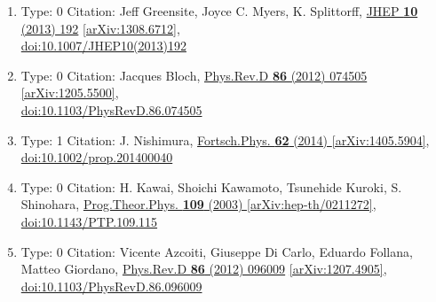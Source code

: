 \documentclass[a4paper,10pt]{article}
\begin{document}
\begin{enumerate}
\begin{enumerate}
  \item Type: 0 Citation: Jeff Greensite, Joyce C. Myers, K. Splittorff, \href{https://www.doi.org/10.1007/JHEP10(2013)192}{JHEP {\bf 10} (2013) 192}  \href{https://arxiv.org/abs/1308.6712}{[arXiv:1308.6712]},\\\href{https://www.doi.org/10.1007/JHEP10(2013)192}{doi:10.1007/JHEP10(2013)192}
  \item Type: 0 Citation: Jacques Bloch, \href{https://www.doi.org/10.1103/PhysRevD.86.074505}{Phys.Rev.D {\bf 86} (2012) 074505}  \href{https://arxiv.org/abs/1205.5500}{[arXiv:1205.5500]},\\\href{https://www.doi.org/10.1103/PhysRevD.86.074505}{doi:10.1103/PhysRevD.86.074505}
  \item Type: 1 Citation: J. Nishimura, \href{https://www.doi.org/10.1002/prop.201400040}{Fortsch.Phys. {\bf 62} (2014) }  \href{https://arxiv.org/abs/1405.5904}{[arXiv:1405.5904]},\\\href{https://www.doi.org/10.1002/prop.201400040}{doi:10.1002/prop.201400040}
  \item Type: 0 Citation: H. Kawai, Shoichi Kawamoto, Tsunehide Kuroki, S. Shinohara, \href{https://www.doi.org/10.1143/PTP.109.115}{Prog.Theor.Phys. {\bf 109} (2003) }  \href{https://arxiv.org/abs/hep-th/0211272}{[arXiv:hep-th/0211272]},\\\href{https://www.doi.org/10.1143/PTP.109.115}{doi:10.1143/PTP.109.115}
  \item Type: 0 Citation: Vicente Azcoiti, Giuseppe Di Carlo, Eduardo Follana, Matteo Giordano, \href{https://www.doi.org/10.1103/PhysRevD.86.096009}{Phys.Rev.D {\bf 86} (2012) 096009}  \href{https://arxiv.org/abs/1207.4905}{[arXiv:1207.4905]},\\\href{https://www.doi.org/10.1103/PhysRevD.86.096009}{doi:10.1103/PhysRevD.86.096009}

\end{enumerate}
\end{enumerate}
\end{document}
